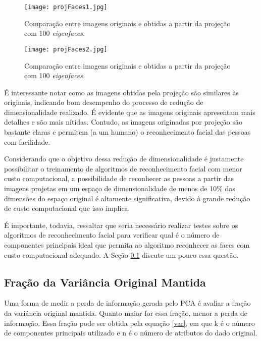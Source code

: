 \documentclass[12pt]{article}
\begin{document}
\begin{figure} [htp]
\begin{center}
\texttt{[image: projFaces1.jpg]}
\caption{Comparação entre imagens originais e obtidas a partir da projeção com 100 \textit{eigenfaces.}} \label{projFaces1}
\end{center}
\end{figure} 

\begin{figure} [htp]
\begin{center}
\texttt{[image: projFaces2.jpg]}
\caption{Comparação entre imagens originais e obtidas a partir da projeção com 100 \textit{eigenfaces.}} \label{projFaces2}
\end{center}
\end{figure} 

É interessante notar como as imagens obtidas pela projeção são similares às originais, indicando bom desempenho do processo de redução de dimensionalidade realizado. É evidente que as imagens originais apresentam mais detalhes e são mais nítidas. Contudo, as imagens originadas por projeção são bastante claras e permitem (a um humano) o reconhecimento facial das pessoas com facilidade. 

Considerando que o objetivo dessa redução de dimensionalidade é justamente possibilitar o treinamento de algoritmos de reconhecimento facial com menor custo computacional, a possibilidade de reconhecer as pessoas a partir das imagens projetas em um espaço de dimensionalidade de menos de 10\% das dimensões do espaço original é altamente significativa, devido à grande redução de custo computacional que isso implica.

É importante, todavia, ressaltar que seria necessário realizar testes sobre os algoritmos de reconhecimento facial para verificar qual é o número de componentes principais ideal que permita ao algoritmo reconhecer as faces com custo computacional adequado. A Seção \ref{var_mant} discute um pouco essa questão. 

\subsection{Fração da Variância Original Mantida} \label{var_mant}
Uma forma de medir a perda de informação gerada pelo PCA é avaliar a fração da variância original mantida. Quanto maior for essa fração, menor a perda de informação. Essa fração pode ser obtida pela equação \ref{var}, em que k é o número de componentes principais utilizado e n é o número de atributos do dado original.
\end{document}
